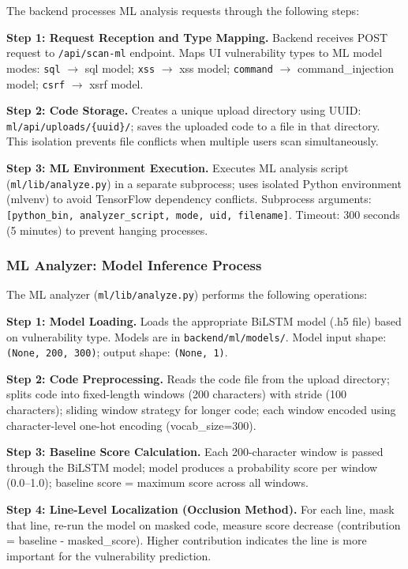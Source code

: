 The backend processes ML analysis requests through the following steps:

\textbf{Step 1: Request Reception and Type Mapping.}
Backend receives POST request to \texttt{/api/scan-ml} endpoint. Maps UI vulnerability types to ML model modes: \texttt{sql} $\rightarrow$ sql model; \texttt{xss} $\rightarrow$ xss model; \texttt{command} $\rightarrow$ command\_injection model; \texttt{csrf} $\rightarrow$ xsrf model.

\textbf{Step 2: Code Storage.}
Creates a unique upload directory using UUID: \texttt{ml/api/uploads/\{uuid\}/}; saves the uploaded code to a file in that directory. This isolation prevents file conflicts when multiple users scan simultaneously.

\textbf{Step 3: ML Environment Execution.}
Executes ML analysis script (\texttt{ml/lib/analyze.py}) in a separate subprocess; uses isolated Python environment (mlvenv) to avoid TensorFlow dependency conflicts. Subprocess arguments: \texttt{[python\_bin, analyzer\_script, mode, uid, filename]}. Timeout: 300 seconds (5 minutes) to prevent hanging processes.

\subsubsection{ML Analyzer: Model Inference Process}
\label{sec:ml_analyzer_inference}

The ML analyzer (\texttt{ml/lib/analyze.py}) performs the following operations:

\textbf{Step 1: Model Loading.} Loads the appropriate BiLSTM model (.h5 file) based on vulnerability type. Models are in \texttt{backend/ml/models/}. Model input shape: \texttt{(None, 200, 300)}; output shape: \texttt{(None, 1)}.

\textbf{Step 2: Code Preprocessing.} Reads the code file from the upload directory; splits code into fixed-length windows (200 characters) with stride (100 characters); sliding window strategy for longer code; each window encoded using character-level one-hot encoding (vocab\_size=300).

\textbf{Step 3: Baseline Score Calculation.} Each 200-character window is passed through the BiLSTM model; model produces a probability score per window (0.0--1.0); baseline score = maximum score across all windows.

\textbf{Step 4: Line-Level Localization (Occlusion Method).} For each line, mask that line, re-run the model on masked code, measure score decrease (contribution = baseline - masked\_score). Higher contribution indicates the line is more important for the vulnerability prediction.

